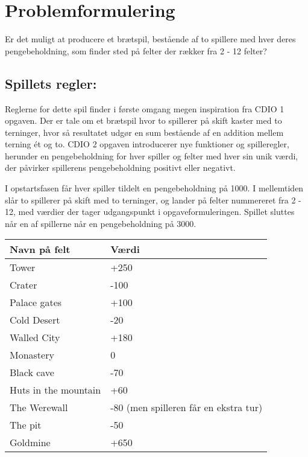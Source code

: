 \chapter{Problemformulering}
Er det muligt at producere et brætspil, bestående af to spillere med hver deres pengebeholdning, som finder sted på felter der rækker fra 2 - 12 felter?

\section*{Spillets regler:}

Reglerne for dette spil finder i første omgang megen inspiration fra CDIO 1 opgaven.
Der er tale om et brætspil hvor to spillerer på skift kaster med to terninger, hvor så resultatet udgør en sum bestående af en addition mellem terning ét og to.
CDIO 2 opgaven introducerer nye funktioner og spilleregler, herunder en pengebeholdning for hver spiller og felter med hver sin unik værdi, der påvirker spillerens pengebeholdning positivt eller negativt.

\vspace{5mm}

I opstartsfasen får hver spiller tildelt en pengebeholdning på 1000.
I mellemtiden slår to spillerer på skift med to terninger, og lander på felter nummereret fra 2 - 12, med værdier der tager udgangspunkt i opgaveformuleringen.
Spillet sluttes når en af spillerne når en pengebeholdning på 3000.

\vspace{5mm}

\begin{tabular}{ | l | p{9cm} |}
    \hline
    \textbf{Navn på felt} & \textbf{Værdi} \\ \hline
    Tower & +250 \\ \hline
    Crater & -100 \\ \hline
    Palace gates & +100 \\ \hline
    Cold Desert & -20 \\ \hline
    Walled City & +180 \\ \hline
    Monastery & 0 \\ \hline
    Black cave & -70 \\ \hline
    Huts in the mountain & +60 \\ \hline
    The Werewall & -80 (men spilleren får en ekstra tur) \\ \hline
    The pit & -50 \\ \hline
    Goldmine & +650 \\ \hline
    \hline
\end{tabular}